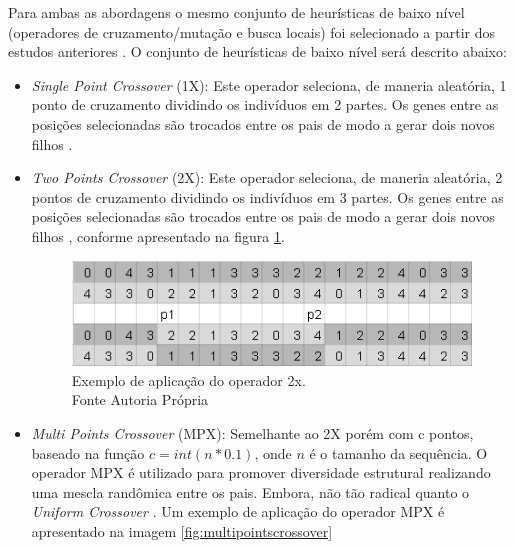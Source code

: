 Para ambas as abordagens o mesmo conjunto de heurísticas de baixo nível (operadores de cruzamento/mutação e busca locais) foi selecionado a partir dos estudos anteriores \cite{custodio2014multiple, custodio2004investigation, garza2012locality,benitez2015algoritmo}. O conjunto de heurísticas de baixo nível será descrito abaixo:

 \begin{itemize}
 	
 		\item \textit{Single Point Crossover} (1X): Este operador seleciona, de maneria aleatória, 1 ponto de cruzamento dividindo os indivíduos em 2 partes. Os genes entre as posições selecionadas são trocados entre os pais de modo a gerar dois novos filhos \cite{benitez2015algoritmo}.
 	
 	\item \textit{Two Points Crossover} (2X): Este operador seleciona, de maneria aleatória, 2 pontos de cruzamento dividindo os indivíduos em 3 partes. Os genes entre as posições selecionadas são trocados entre os pais de modo a gerar dois novos filhos \cite{benitez2015algoritmo}, conforme apresentado na figura \ref{fig:twopointscrossover}.
 	
 	
 	\begin{figure}[!htb]
 		\centering
 		\includegraphics{Imagens/TwoPointsCrossover.png}
 		\caption{Exemplo de aplicação do operador 2x. \\Fonte Autoria Própria}
 		\label{fig:twopointscrossover}
 	\end{figure}
 	
 	
 	
 	
 	\item \textit{Multi Points Crossover} (MPX): Semelhante ao 2X porém com c pontos, baseado na função $c = int(n * 0.1)$, onde $n$ é o tamanho da sequência. O operador MPX é utilizado para promover diversidade estrutural realizando uma mescla randômica entre os pais. Embora, não tão radical quanto o \textit{Uniform  Crossover} \cite{sabar2015automatic}. Um exemplo de aplicação do operador MPX é apresentado na imagem \ref{fig:multipointscrossover}
 	

\end{itemize}
